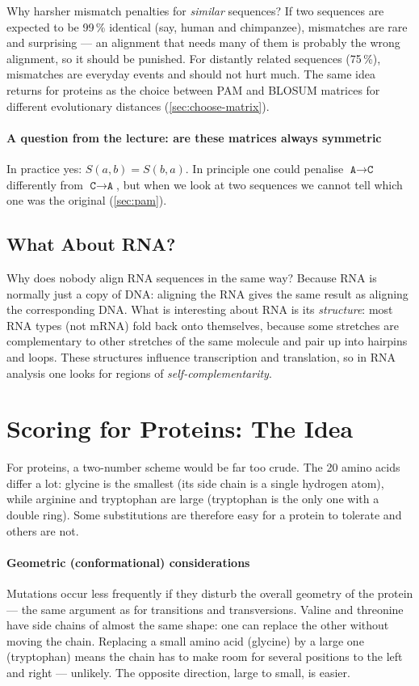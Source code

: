 \documentclass[11pt, oneside]{book}
\newcommand{\seq}[1]{\texttt{#1}}
\let\originalsection\section
\renewcommand{\section}{\Needspace{7\baselineskip}\originalsection}
\let\originalsubsection\subsection
\renewcommand{\subsection}{\Needspace{6\baselineskip}\originalsubsection}
\begin{document}
\begin{intbox}
Why harsher mismatch penalties for \emph{similar} sequences? If two sequences
are expected to be 99\,\% identical (say, human and chimpanzee), mismatches
are rare and surprising --- an alignment that needs many of them is probably
the wrong alignment, so it should be punished. For distantly related
sequences (75\,\%), mismatches are everyday events and should not hurt much.
The same idea returns for proteins as the choice between PAM and BLOSUM
matrices for different evolutionary distances (\cref{sec:choose-matrix}).
\end{intbox}

\paragraph{A question from the lecture: are these matrices always symmetric}
In practice yes: $S(a,b) = S(b,a)$. In principle one could penalise
$\seq{A} \to \seq{C}$ differently from $\seq{C} \to \seq{A}$, but when we look
at two sequences we cannot tell which one was the original (\cref{sec:pam}).

\subsection{What About RNA?}

Why does nobody align RNA sequences in the same way? Because RNA is normally
just a copy of DNA: aligning the RNA gives the same result as aligning the
corresponding DNA. What is interesting about RNA is its \emph{structure}: most
RNA types (not mRNA) fold back onto themselves, because some stretches are
complementary to other stretches of the same molecule and pair up into
hairpins and loops. These structures influence transcription and translation,
so in RNA analysis one looks for regions of \emph{self-complementarity}.

\section{Scoring for Proteins: The Idea}

For proteins, a two-number scheme would be far too crude. The 20 amino
acids differ a lot: glycine is the smallest (its side chain is a single
hydrogen atom), while arginine and tryptophan are large (tryptophan is the
only one with a double ring). Some substitutions are therefore easy for a
protein to tolerate and others are not.

\paragraph{Geometric (conformational) considerations}
Mutations occur less frequently if they disturb the overall geometry of the
protein --- the same argument as for transitions and transversions. Valine
and threonine have side chains of almost the same shape: one can replace the
other without moving the chain. Replacing a small amino acid (glycine) by a
large one (tryptophan) means the chain has to make room for several positions
to the left and right --- unlikely. The opposite direction, large to small, is
easier.
\end{document}
